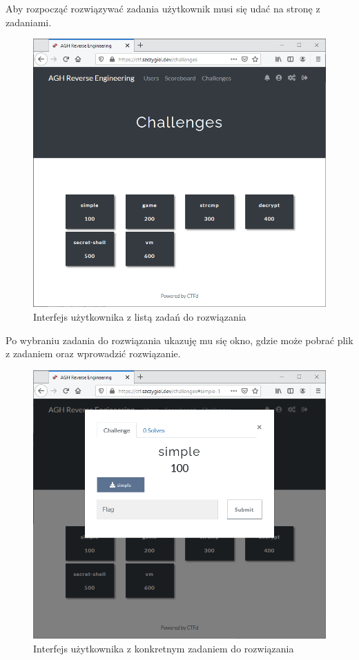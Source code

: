 \documentclass[language=polish,type=eng]{aghmodern}
\begin{document}
Aby rozpocząć rozwiązywać zadania użytkownik musi się udać na stronę z zadaniami.

\begin{figure}[H]
\centering
\includegraphics[width=\textwidth]{ui_challenges}
\caption{Interfejs użytkownika z listą zadań do rozwiązania}
\end{figure}

Po wybraniu zadania do rozwiązania ukazuję mu się okno,
gdzie może pobrać plik z zadaniem oraz wprowadzić rozwiązanie.

\begin{figure}[H]
\centering
\includegraphics[width=\textwidth]{ui_download}
\caption{Interfejs użytkownika z konkretnym zadaniem do rozwiązania}
\end{figure}
\end{document}
